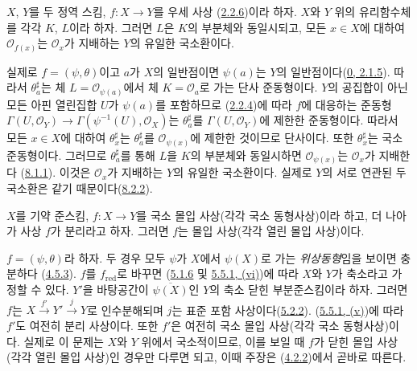 \begin{proposition}[8.2.7]
\label{I.8.2.7-ko}
$X$, $Y$를 두 정역 스킴, $f:X\to Y$를 우세 사상
(\hyperref[I.2.2.6-ko]{2.2.6})이라 하자. $X$와 $Y$ 위의 유리함수체를
각각 $K$, $L$이라 하자. 그러면 $L$은 $K$의 부분체와 동일시되고,
모든 $x\in X$에 대하여 $\mathscr{O}_{f(x)}$는 $\mathscr{O}_x$가
지배하는 $Y$의 유일한 국소환이다.
\end{proposition}

실제로 $f=(\psi,\theta)$이고 $a$가 $X$의 일반점이면 $\psi(a)$는
$Y$의 일반점이다(\hyperref[0.2.1.5-ko]{0, 2.1.5}). 따라서
$\theta_a^\sharp$는 체 $L=\mathscr{O}_{\psi(a)}$에서 체
$K=\mathscr{O}_a$로 가는 단사 준동형이다. $Y$의 공집합이 아닌 모든
아핀 열린집합 $U$가 $\psi(a)$를 포함하므로
(\hyperref[I.2.2.4-ko]{2.2.4})에 따라 $f$에 대응하는 준동형
$\Gamma(U,\mathscr{O}_Y)\to
\Gamma(\psi^{-1}(U),\mathscr{O}_X)$는
$\theta_a^\sharp$를 $\Gamma(U,\mathscr{O}_Y)$에 제한한 준동형이다.
따라서 모든 $x\in X$에 대하여 $\theta_x^\sharp$는
$\theta_a^\sharp$를 $\mathscr{O}_{\psi(x)}$에 제한한 것이므로
단사이다. 또한 $\theta_x^\sharp$는 국소 준동형이다. 그러므로
$\theta_a^\sharp$를 통해 $L$을 $K$의 부분체와 동일시하면
$\mathscr{O}_{\psi(x)}$는 $\mathscr{O}_x$가 지배한다
(\hyperref[I.8.1.1-ko]{8.1.1}). 이것은 $\mathscr{O}_x$가 지배하는
$Y$의 유일한 국소환이다. 실제로 $Y$의 서로 연관된 두 국소환은
같기 때문이다(\hyperref[I.8.2.2-ko]{8.2.2}).

\begin{proposition}[8.2.8]
\label{I.8.2.8-ko}
$X$를 기약 준스킴, $f:X\to Y$를 국소 몰입 사상(각각 국소
동형사상)이라 하고, 더 나아가 사상 $f$가 분리라고 하자. 그러면
$f$는 몰입 사상(각각 열린 몰입 사상)이다.
\end{proposition}

$f=(\psi,\theta)$라 하자. 두 경우 모두 $\psi$가 $X$에서
$\psi(X)$로 가는 \emph{위상동형}임을 보이면 충분하다
(\hyperref[I.4.5.3-ko]{4.5.3}). $f$를 $f_{\mathrm{red}}$로 바꾸면
(\hyperref[I.5.1.6-ko]{5.1.6} 및
\hyperref[I.5.5.1-ko]{5.5.1, (vi)})에 따라 $X$와 $Y$가 축소라고 가정할 수
있다. $Y'$을 바탕공간이 $\overline{\psi(X)}$인 $Y$의 축소 닫힌
부분준스킴이라 하자. 그러면 $f$는
$X\xrightarrow{f'}Y'\xrightarrow{j}Y$로 인수분해되며 $j$는 표준 포함
사상이다(\hyperref[I.5.2.2-ko]{5.2.2}).
(\hyperref[I.5.5.1-ko]{5.5.1, (v)})에 따라 $f'$도 여전히 분리
사상이다. 또한 $f'$은 여전히
국소 몰입 사상(각각 국소 동형사상)이다. 실제로 이 문제는 $X$와
$Y$ 위에서 국소적이므로, 이를 보일 때 $f$가 닫힌 몰입 사상(각각
열린 몰입 사상)인 경우만 다루면 되고, 이때 주장은
(\hyperref[I.4.2.2-ko]{4.2.2})에서 곧바로 따른다.

